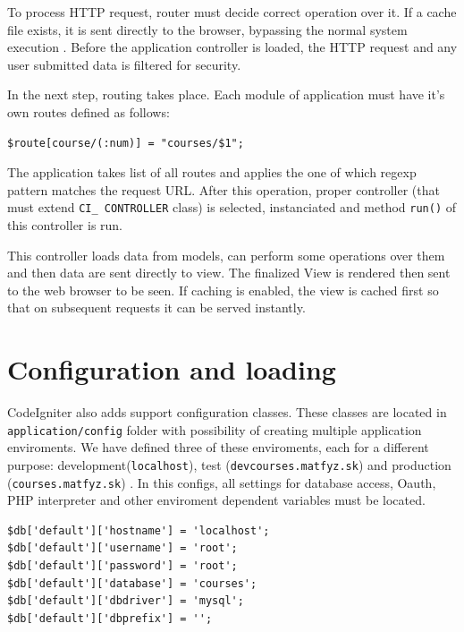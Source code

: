 To process HTTP request, router must decide correct operation over it. If a cache file exists, it is sent directly to the browser, bypassing the normal system execution \cite{codeigniter}. Before the application controller is loaded, the HTTP request and any user submitted data is filtered for security.


In the next step, routing takes place. Each module of application must have it's own routes defined as follows:

\begin{lstlisting}[basicstyle=\small,caption={CodeIgniter routing}]
$route[course/(:num)] = "courses/$1";
\end{lstlisting}


The application takes list of all routes and applies the one of which regexp pattern matches the request URL. After this operation, proper controller (that must extend \texttt{CI\_ CONTROLLER} class) is selected, instanciated and method \texttt{run()} of this controller is run.


This controller loads data from models, can perform some operations over them and then data are sent directly to view. The finalized View is rendered then sent to the web browser to be seen. If caching is enabled, the view is cached first so that on subsequent requests it can be served instantly.

\section{Configuration and loading}

CodeIgniter also adds support configuration classes. These classes are located in \texttt{application/config} folder with possibility of creating multiple application enviroments. We have defined three of these enviroments, each for a different purpose: development(\texttt{localhost}), test (\texttt{devcourses.matfyz.sk}) and production (\texttt{courses.matfyz.sk}) . In this configs, all settings for database access, Oauth, PHP interpreter and other enviroment dependent variables must be located. 

\begin{lstlisting}[basicstyle=\small,caption={Database configuration for development enviroment}]
$db['default']['hostname'] = 'localhost';
$db['default']['username'] = 'root';
$db['default']['password'] = 'root';
$db['default']['database'] = 'courses';
$db['default']['dbdriver'] = 'mysql';
$db['default']['dbprefix'] = '';
\end{lstlisting}


